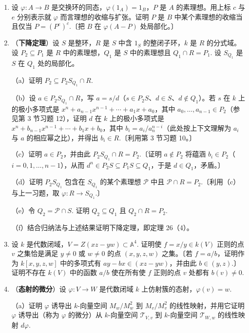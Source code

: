 \begin{enumerate}
\item 设 \(\varphi : A \to B\) 是交换环的同态，\(\varphi(1_A) = 1_B\)，\(P\) 是 \(A\) 的素理想。用上标 \(c\) 与 \(e\) 分别表示就 \(\varphi\) 而言理想的收缩与扩张。证明 \(P\) 是 \(B\) 中某个素理想的收缩当且仅当 \(P = (P^e)^c\).〔把 \(B\) 在 \(\varphi(A-P)\) 处局部化。〕

\item （\textbf{下降定理}）设 \(S\) 是整环，\(R\) 是 \(S\) 中含 \(1_S\) 的整闭子环，\(k\) 是 \(R\) 的分式域。设 \(P_2 \subseteq P_1\) 是 \(R\) 中的素理想，\(Q_1\) 是 \(S\) 中的素理想且 \(Q_1 \cap R = P_1\). 设 \(S_{Q_1}\) 是 \(S\) 在 \(Q_1\) 处的局部化。

（a）证明 \(P_2 \subseteq P_2S_{Q_1} \cap R\).

（b）设 \(a \in P_2S_{Q_1} \cap R\)，写 \(a = s/d\)（\(s \in P_2S\)、\(d \in S\)、\(d \notin Q_1\)）。若 \(s\) 在 \(k\) 上的极小多项式是 \(x^n+a_{n-1}x^{n-1}+\cdots+a_1x+a_0\)，其中 \(a_0, \ldots, a_{n-1} \in P_2\)（参见第 3 节习题 12），证明 \(d\) 在 \(k\) 上的极小多项式是 \(x^n+b_{n-1}x^{n-1}+\cdots+b_1x+b_0\)，其中 \(b_i = a_i/a_n^{n-i}\)（此处按上下文理解为 \(a_i\) 与 \(a\) 的相应幂之比），并得出 \(b_i \in R\).〔利用第 3 节习题 10。〕

（c）证明 \(a \in P_2\)，并由此 \(P_2S_{Q_1} \cap R = P_2\).〔证明 \(a \notin P_2\) 将蕴涵 \(b_i \in P_2\)（\(i = 0, 1, \ldots, n-1\)），从而 \(d^n \in P_2S \subseteq P_1S \subseteq Q_1\)，于是 \(d \in Q_1\)，矛盾。〕

（d）证明 \(P_2S_{Q_1}\) 包含在 \(S_{Q_1}\) 的某个素理想 \(\mathcal{P}\) 中且 \(\mathcal{P} \cap R = P_2\).〔利用（c）与上一习题，取 \(\varphi : R \to S_{Q_1}\).〕

（e）令 \(Q_2 = \mathcal{P} \cap S\). 证明 \(Q_2 \subseteq Q_1\) 且 \(Q_2 \cap R = P_2\).

（f）结合归纳法与上述结果证明下降定理，即定理 26（4）。

\item 设 \(k\) 是代数闭域，\(V = Z(xz-yw) \subset \mathbb{A}^4\). 证明使 \(f = x/y \in k(V)\) 正则的点 \(v\) 之集恰是满足 \(y \neq 0\) 或 \(w \neq 0\) 的点 \((x,y,z,w)\) 之集。〔若 \(f = a/b\)，证明作为 \(k[x,y,z,w]\) 中的多项式有 \(ay-bx \in (xz-yw)\)，并由此 \(b \in (y,z)\).〕证明不存在 \(k(V)\) 中的函数 \(a/b\) 使在所有使 \(f\) 正则的点 \(v\) 处都有 \(b(v) \neq 0\).

\item （\textbf{态射的微分}）设 \(\varphi : V \to W\) 是代数闭域 \(k\) 上仿射簇的态射，\(\varphi(v) = w\).

（a）证明 \(\varphi\) 诱导出 \(k\)-向量空间 \(M_w/M_w^2\) 到 \(M_v/M_v^2\) 的线性映射，并用它证明 \(\varphi\) 诱导出（称为 \(\varphi\) 的微分）从 \(k\)-向量空间 \(\mathcal{T}_{V,v}\) 到 \(k\)-向量空间 \(\mathcal{T}_{W,w}\) 的线性映射 \(d\varphi\).


\end{enumerate}
